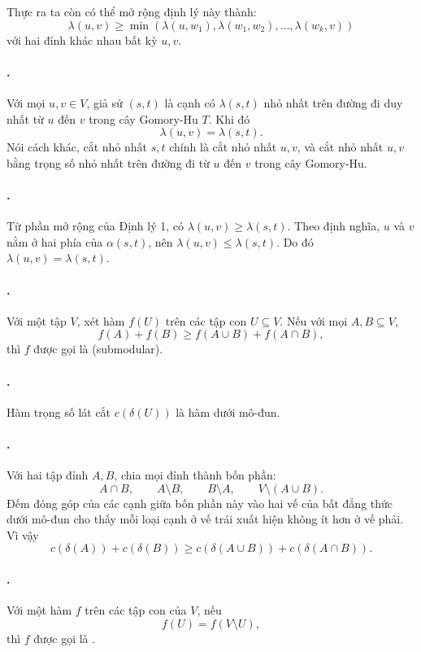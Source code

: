 \documentclass[11pt]{article}
\begin{document}
Thực ra ta còn có thể mở rộng định lý này thành:
\[
  \lambda(u,v)\ge
  \min(\lambda(u,w_1),\lambda(w_1,w_2),\ldots,\lambda(w_k,v))
\]
với hai đỉnh khác nhau bất kỳ \(u,v\).

\paragraph{.}
Với mọi \(u,v\in V\), giả sử \((s,t)\) là cạnh có \(\lambda(s,t)\) nhỏ nhất
trên đường đi duy nhất từ \(u\) đến \(v\) trong cây Gomory-Hu \(T\). Khi đó
\[
  \lambda(u,v)=\lambda(s,t).
\]
Nói cách khác, cắt nhỏ nhất \(s,t\) chính là cắt nhỏ nhất \(u,v\), và cắt nhỏ
nhất \(u,v\) bằng trọng số nhỏ nhất trên đường đi từ \(u\) đến \(v\) trong cây
Gomory-Hu.

\paragraph{.}
Từ phần mở rộng của Định lý 1, có \(\lambda(u,v)\ge\lambda(s,t)\). Theo định
nghĩa, \(u\) và \(v\) nằm ở hai phía của \(\alpha(s,t)\), nên
\(\lambda(u,v)\le\lambda(s,t)\). Do đó \(\lambda(u,v)=\lambda(s,t)\).

\paragraph{.}
Với một tập \(V\), xét hàm \(f(U)\) trên các tập con \(U\subseteq V\). Nếu với
mọi \(A,B\subseteq V\),
\[
  f(A)+f(B)\ge f(A\cup B)+f(A\cap B),
\]
thì \(f\) được gọi là  (submodular).

\paragraph{.}
Hàm trọng số lát cắt \(c(\delta(U))\) là hàm dưới mô-đun.

\paragraph{.}
Với hai tập đỉnh \(A,B\), chia mọi đỉnh thành bốn phần:
\[
  A\cap B,\qquad A\setminus B,\qquad B\setminus A,\qquad
  V\setminus(A\cup B).
\]
Đếm đóng góp của các cạnh giữa bốn phần này vào hai vế của bất đẳng thức dưới
mô-đun cho thấy mỗi loại cạnh ở vế trái xuất hiện không ít hơn ở vế phải.
Vì vậy
\[
  c(\delta(A))+c(\delta(B))
  \ge c(\delta(A\cup B))+c(\delta(A\cap B)).
\]

\paragraph{.}
Với một hàm \(f\) trên các tập con của \(V\), nếu
\[
  f(U)=f(V\setminus U),
\]
thì \(f\) được gọi là .
\end{document}
